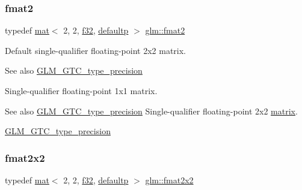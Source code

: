 \subsubsection{\texorpdfstring{fmat2}{fmat2}}
{\footnotesize\ttfamily typedef \hyperlink{structglm_1_1mat}{mat}$<$ 2, 2, \hyperlink{group__gtc__type__precision_ga0ec999b57f5330d9021256e96038df04}{f32}, \hyperlink{namespaceglm_a36ed105b07c7746804d7fdc7cc90ff25a9d21ccd8b5a009ec7eb7677befc3bf51}{defaultp} $>$ \hyperlink{group__gtc__type__precision_ga687a2fb53c536086879726d0c0f88a8b}{glm\+::fmat2}}

Default single-\/qualifier floating-\/point 2x2 matrix. \begin{DoxySeeAlso}{See also}
\hyperlink{group__gtc__type__precision}{G\+L\+M\+\_\+\+G\+T\+C\+\_\+type\+\_\+precision}
\end{DoxySeeAlso}
Single-\/qualifier floating-\/point 1x1 matrix. \begin{DoxySeeAlso}{See also}
\hyperlink{group__gtc__type__precision}{G\+L\+M\+\_\+\+G\+T\+C\+\_\+type\+\_\+precision} Single-\/qualifier floating-\/point 2x2 \hyperlink{_s_d_l__opengl__glext_8h_a7b24a3f2f56eb1244ae69dacb4fecb6f}{matrix}. 

\hyperlink{group__gtc__type__precision}{G\+L\+M\+\_\+\+G\+T\+C\+\_\+type\+\_\+precision} 
\end{DoxySeeAlso}
\mbox{\label{group__gtc__type__precision_gad3b3ab6399b8b960e8994b37521bab86}} 
\subsubsection{\texorpdfstring{fmat2x2}{fmat2x2}}
{\footnotesize\ttfamily typedef \hyperlink{structglm_1_1mat}{mat}$<$ 2, 2, \hyperlink{group__gtc__type__precision_ga0ec999b57f5330d9021256e96038df04}{f32}, \hyperlink{namespaceglm_a36ed105b07c7746804d7fdc7cc90ff25a9d21ccd8b5a009ec7eb7677befc3bf51}{defaultp} $>$ \hyperlink{group__gtc__type__precision_gad3b3ab6399b8b960e8994b37521bab86}{glm\+::fmat2x2}}

